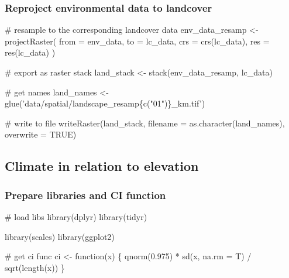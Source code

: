 \documentclass[]{article}
\newenvironment{Shaded}{}{}
\newcommand{\CommentTok}[1]{\textcolor[rgb]{0.00,0.50,0.00}{#1}}
\newcommand{\ControlFlowTok}[1]{\textcolor[rgb]{0.00,0.00,1.00}{#1}}
\newcommand{\DataTypeTok}[1]{#1}
\newcommand{\FloatTok}[1]{#1}
\newcommand{\KeywordTok}[1]{\textcolor[rgb]{0.00,0.00,1.00}{#1}}
\newcommand{\NormalTok}[1]{#1}
\newcommand{\OperatorTok}[1]{#1}
\newcommand{\OtherTok}[1]{\textcolor[rgb]{1.00,0.25,0.00}{#1}}
\newcommand{\StringTok}[1]{\textcolor[rgb]{0.00,0.50,0.50}{#1}}
\begin{document}
\hypertarget{reproject-environmental-data-to-landcover}{%
\subsubsection{Reproject environmental data to landcover}\label{reproject-environmental-data-to-landcover}}

\begin{Shaded}
\begin{Highlighting}[]

\CommentTok{# resample to the corresponding landcover data}
\NormalTok{env_data_resamp <-}\StringTok{ }\KeywordTok{projectRaster}\NormalTok{(}
  \DataTypeTok{from =}\NormalTok{ env_data, }\DataTypeTok{to =}\NormalTok{ lc_data,}
  \DataTypeTok{crs =} \KeywordTok{crs}\NormalTok{(lc_data), }\DataTypeTok{res =} \KeywordTok{res}\NormalTok{(lc_data)}
\NormalTok{)}

\CommentTok{# export as raster stack}
\NormalTok{land_stack <-}\StringTok{ }\KeywordTok{stack}\NormalTok{(env_data_resamp, lc_data)}

\CommentTok{# get names}
\NormalTok{land_names <-}\StringTok{ }\KeywordTok{glue}\NormalTok{(}\StringTok{'data/spatial/landscape_resamp\{c("01")\}_km.tif'}\NormalTok{)}

\CommentTok{# write to file}
\KeywordTok{writeRaster}\NormalTok{(land_stack, }\DataTypeTok{filename =} \KeywordTok{as.character}\NormalTok{(land_names), }\DataTypeTok{overwrite =} \OtherTok{TRUE}\NormalTok{)}
\end{Highlighting}
\end{Shaded}

\hypertarget{climate-in-relation-to-elevation}{%
\subsection{Climate in relation to elevation}\label{climate-in-relation-to-elevation}}

\hypertarget{prepare-libraries-and-ci-function}{%
\subsubsection{Prepare libraries and CI function}\label{prepare-libraries-and-ci-function}}

\begin{Shaded}
\begin{Highlighting}[]
\CommentTok{# load libs}
\KeywordTok{library}\NormalTok{(dplyr)}
\KeywordTok{library}\NormalTok{(tidyr)}

\KeywordTok{library}\NormalTok{(scales)}
\KeywordTok{library}\NormalTok{(ggplot2)}

\CommentTok{# get ci func}
\NormalTok{ci <-}\StringTok{ }\ControlFlowTok{function}\NormalTok{(x) \{}
  \KeywordTok{qnorm}\NormalTok{(}\FloatTok{0.975}\NormalTok{) }\OperatorTok{*}\StringTok{ }\KeywordTok{sd}\NormalTok{(x, }\DataTypeTok{na.rm =}\NormalTok{ T) }\OperatorTok{/}\StringTok{ }\KeywordTok{sqrt}\NormalTok{(}\KeywordTok{length}\NormalTok{(x))}
\NormalTok{\}}
\end{Highlighting}
\end{Shaded}
\end{document}

